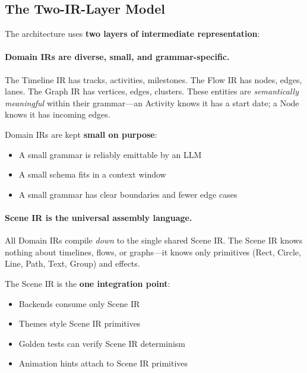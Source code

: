 \subsection{The Two-IR-Layer Model}
\label{sec:two-ir-model}

The architecture uses \textbf{two layers of intermediate representation}:


\paragraph{Domain IRs are diverse, small, and grammar-specific.}
The Timeline IR has tracks, activities, milestones. The Flow IR has nodes, edges, lanes. The Graph IR has vertices, edges, clusters. These entities are \emph{semantically meaningful} within their grammar---an Activity knows it has a start date; a Node knows it has incoming edges.

Domain IRs are kept \textbf{small on purpose}:
\begin{itemize}
  \item A small grammar is reliably emittable by an LLM
  \item A small schema fits in a context window
  \item A small grammar has clear boundaries and fewer edge cases
\end{itemize}

\paragraph{Scene IR is the universal assembly language.}
All Domain IRs compile \emph{down} to the single shared Scene IR. The Scene IR knows nothing about timelines, flows, or graphs---it knows only primitives (Rect, Circle, Line, Path, Text, Group) and effects.

The Scene IR is the \textbf{one integration point}:
\begin{itemize}
  \item Backends consume only Scene IR
  \item Themes style Scene IR primitives
  \item Golden tests can verify Scene IR determinism
  \item Animation hints attach to Scene IR primitives
\end{itemize}

